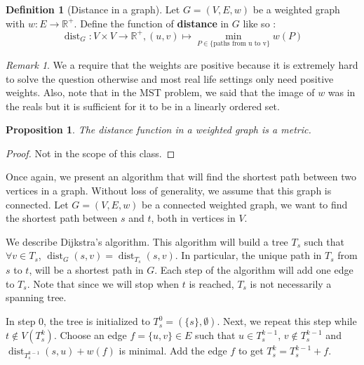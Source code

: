 \documentclass{tufte-handout}
\newtheorem{prop}[thm]{Proposition}
\theoremstyle{definition}
\newtheorem{defn}[thm]{Definition}
\theoremstyle{remark}
\newtheorem{rem}[thm]{Remark}
\newcommand{\R}{\mathbb{R}}
\DeclareMathOperator{\dist}{dist}
\begin{document}
\begin{defn}[Distance in a graph]
	Let $G = (V,E,w)$ be a weighted graph with $w : E \rightarrow \R^{+}$. Define the function of \textbf{distance} in $G$ like so :
	$$ \dist_G : V \times V \rightarrow \R^{+}, (u,v) \mapsto \min_{P \in \{\mbox{paths from u to v}\}} w(P)$$
\end{defn}
\begin{rem}
	We a require that the weights are positive because it is extremely hard to solve the question otherwise and most real life settings only need positive weights. Also, note that in the MST problem, we said that the image of $w$ was in the reals but it is sufficient for it to be in a linearly ordered set.
\end{rem}
\begin{prop}
	The distance function in a weighted graph is a metric.
\end{prop}
\begin{proof}
	Not in the scope of this class.
\end{proof}

Once again, we present an algorithm that will find the shortest path between two vertices in a graph. Without loss of generality, we assume that this graph is connected. Let $G = (V,E,w)$ be a connected weighted graph, we want to find the shortest path between $s$ and $t$, both in vertices in $V$.

We describe Dijkstra's algorithm. This algorithm will build a tree $T_s$ such that $\forall v \in T_s$, $\dist_G(s,v) = \dist_{T_s}(s,v)$. In particular, the unique path in $T_s$ from $s$ to $t$, will be a shortest path in $G$. Each step of the algorithm will add one edge to $T_s$. Note that since we will stop when $t$ is reached, $T_s$ is not necessarily a spanning tree. 

In step 0, the tree is initialized to $T_s^0 = (\{s\},\emptyset)$. Next, we repeat this step while $t \notin V(T_s^k)$. Choose an edge $f = \{u,v\} \in E$ such that $u \in T_s^{k-1}$, $v \notin T_s^{k-1}$ and $\dist_{T_s^{k-1}}(s,u) + w(f)$ is minimal. Add the edge $f$ to get $T_s^k = T_s^{k-1}+f$.
\end{document}
